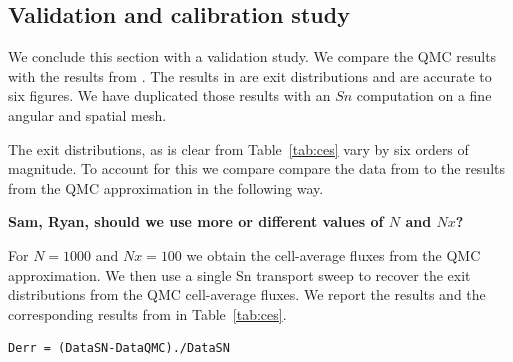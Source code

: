 \subsection{Validation and calibration study}
\label{validation-and-calibration-study}

We conclude this section with a validation study. We compare the
QMC results with the results from \cite{cesinh}. The results
in  are exit distributions and are accurate to 
six figures. We have duplicated those results with an $Sn$ computation
on a fine angular and spatial mesh.

The exit distributions, as is clear from Table~\ref{tab:ces}
vary by six orders of magnitude. To account for this we compare
compare the data from \cite{cesinh} to the results from the QMC
approximation in the following way. 

{\bf Sam, Ryan, should we use more or different values of $N$ and $Nx$?}

For $N = 1000$ and $Nx=100$ we obtain the cell-average fluxes from
the QMC approximation. We then use a single Sn transport sweep to recover
the exit distributions from the QMC cell-average fluxes. We report
the results and the corresponding results from \cite{cesinh} in 
Table~\ref{tab:ces}.



\begin{verbatim}
Derr = (DataSN-DataQMC)./DataSN
\end{verbatim}



